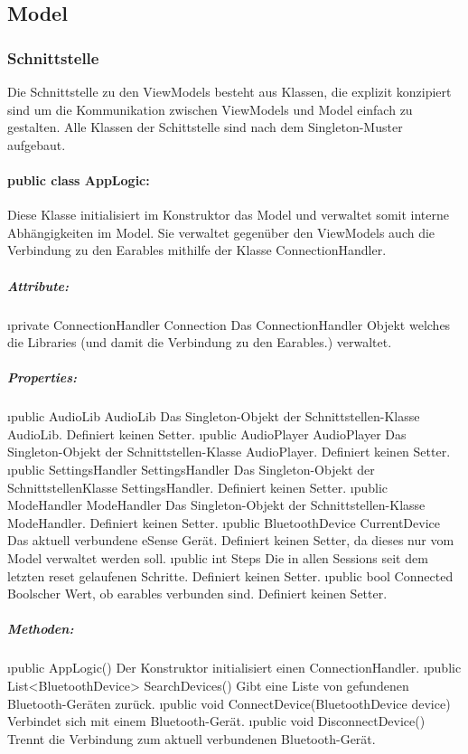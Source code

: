 \documentclass[../entwurf.tex]{subfiles}
\begin{document}
	\subsection{Model}
		\subsubsection{Schnittstelle}
			Die Schnittstelle zu den ViewModels besteht aus Klassen, die explizit konzipiert sind um die Kommunikation zwischen ViewModels und Model 
			einfach zu gestalten. Alle Klassen der Schittstelle sind nach dem Singleton-Muster aufgebaut.
			\paragraph{public class AppLogic:}
				Diese Klasse initialisiert im Konstruktor das Model und verwaltet somit interne Abhängigkeiten im Model. Sie verwaltet gegenüber den
				ViewModels auch die Verbindung zu den Earables mithilfe der Klasse ConnectionHandler.
				\subparagraph{Attribute:}
					\begin{itemize}
						\i{private ConnectionHandler Connection} Das ConnectionHandler Objekt welches die Libraries 
						(und damit die Verbindung zu den Earables.) verwaltet.
					\end{itemize}
				\subparagraph{Properties:}
					\begin{itemize}
						\i{public AudioLib AudioLib} Das Singleton-Objekt der Schnittstellen-Klasse AudioLib. Definiert keinen Setter.
						\i{public AudioPlayer AudioPlayer} Das Singleton-Objekt der Schnittstellen-Klasse AudioPlayer. Definiert keinen Setter.
						\i{public SettingsHandler SettingsHandler} Das Singleton-Objekt der SchnittstellenKlasse SettingsHandler. 
						Definiert keinen Setter.
						\i{public ModeHandler ModeHandler} Das Singleton-Objekt der Schnittstellen-Klasse ModeHandler. Definiert keinen Setter.
						\i{public BluetoothDevice CurrentDevice} Das aktuell verbundene eSense Gerät. Definiert keinen Setter, da dieses nur vom Model
						verwaltet werden soll.
						\i{public int Steps} Die in allen Sessions seit dem letzten reset gelaufenen Schritte. Definiert keinen Setter.
						\i{public bool Connected} Boolscher Wert, ob earables verbunden sind. Definiert keinen Setter.
					\end{itemize}
				\subparagraph{Methoden:}
					\begin{itemize}
						\i{public AppLogic()} Der Konstruktor initialisiert einen ConnectionHandler.
						\i{public List<BluetoothDevice> SearchDevices()} Gibt eine Liste von gefundenen Bluetooth-Geräten zurück.
						\i{public void ConnectDevice(BluetoothDevice device)} Verbindet sich mit einem Bluetooth-Gerät.
						\i{public void DisconnectDevice()} Trennt die Verbindung zum aktuell verbundenen Bluetooth-Gerät.
					\end{itemize}
\end{document}
